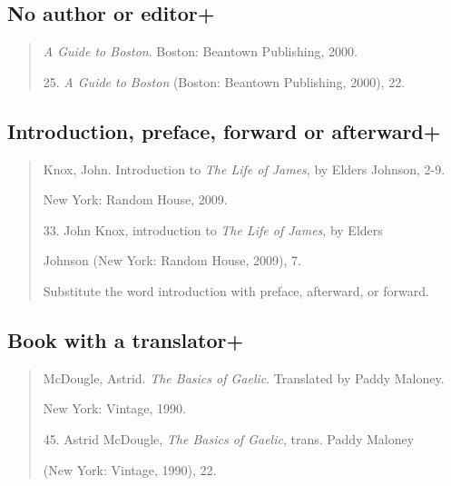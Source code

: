 \subsection{No author or editor+}

\begin{quote}

\emph{A Guide to Boston}. Boston: Beantown Publishing, 2000.

\medskip

\hspace{.4in}25. \emph{A Guide to Boston} (Boston: Beantown Publishing, 2000), 22.
\end{quote}

\subsection{Introduction, preface, forward or afterward+}
\begin{quote}

Knox, John. Introduction to \emph{The Life of James}, by Elders Johnson, 2-9.

\hspace{.4in}New York: Random House, 2009.

\medskip

\hspace{.4in}33. John Knox, introduction to \emph{The Life of James}, by Elders 

Johnson (New York: Random House, 2009), 7.

\medskip

 Substitute the word introduction with preface, afterward, or forward.

\end{quote}

\subsection{Book with a translator+} 
\begin{quote}
McDougle, Astrid. \emph{The Basics of Gaelic}. Translated by Paddy Maloney.

\hspace{.4in}New York: Vintage, 1990.

\medskip

\hspace{.4in}45. Astrid McDougle, \emph{The Basics of Gaelic}, trans. Paddy Maloney

(New York: Vintage, 1990), 22.
\end{quote}


